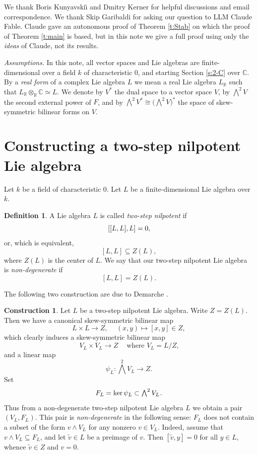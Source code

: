 \documentclass[11pt]{amsart}
\theoremstyle{plain}
\theoremstyle{definition}
\newtheorem{definition}[theorem]{Definition}
\newtheorem{construction}[theorem]{Construction}
\newcommand{\hs}{\kern 0.8pt}
\newcommand{\C}{{\mathds C}}
\newcommand{\R}{{\mathds R}}
\renewcommand{\Lambda}{\textstyle\bigwedge}
\begin{document}
We thank Boris Kunyavski\u{\i} and Dmitry Kerner for helpful discussions and email correspondence.
We thank Skip Garibaldi for asking our question to LLM Claude Fable.
Claude gave an autonomous proof of Theorem \ref{t:Stab} on which the proof of Theorem \ref{t:main} is based,
but in this note we give a full proof using only the {\em ideas} of Claude, not its results.

\noindent
{\em Assumptions.} In this note, all vector spaces and Lie algebras are finite-dimensional
over a field $k$ of characteristic 0, and starting Section \ref{s:2-C} over $\C$.
By a {\em real form} of a complex Lie algebra $L$
we mean a real Lie algebra $L_\R$ such that $L_\R\otimes_\R \C\simeq L$.
We denote by $V^*$ the dual space to a vector space $V$, by $\Lambda^2 V$ the second external power of $F$,
and by $\Lambda^2 V^*\cong\big(\Lambda^2 V\big)^*$ the space of skew-symmetric bilinear forms on $V$.




\section{Constructing a two-step nilpotent Lie algebra}
\label{s:V,F}

Let $k$ be a field of characteristic 0.
Let $L$ be a finite-dimensional Lie algebra over $k$.

\begin{definition}
A Lie algebra $L$  is called {\em two-step nilpotent}
if
\[\hs [[L,L],L]=0,\]
or, which is equivalent,
\[ [L,L]\subseteq Z(L),\]
where $Z(L)$ is the center of $L$.
We say that our two-step nilpotent Lie algebra is {\em non-degenerate} if
\[ [L,L]=Z(L).\]
\end{definition}

The following two construction are due to Demarche \cite{Demarche}.

\begin{construction}\label{con:L-to-VF}
Let $L$ be a two-step nilpotent Lie algebra.
Write $Z=Z(L)$.
Then we have a canonical skew-symmetric bilinear map
\[ L\times L\to Z, \quad\ (x,y)\mapsto [x,y]\in Z,\]
which clearly induces a  skew-symmetric bilinear map
\[V_L\times V_L\to Z\quad\ \text{where $V_L=L/Z$,}\]
and a linear map
\[\psi_L\colon \Lambda^2 V_L\to Z.\]
Set
\[ F_L=\ker \psi_L\subset\Lambda^2 V_L\hs.\]
Thus from a non-degenerate two-step nilpotent Lie algebra $L$ we obtain a pair $(V_L, F_L)$.
This pair is {\em non-degenerate} in the following sense: $F_L$ does not contain a subset of the form $v\wedge V_L$
for any nonzero $v\in V_L$. Indeed, assume that $v\wedge V_L\subseteq F_L$, and let $\tilde v\in L$ be a preimage of $v$.
Then $[\tilde v,y]=0$ for all $y\in L$, whence $\tilde  v\in Z$ and $v=0$.
\end{construction}
\end{document}
